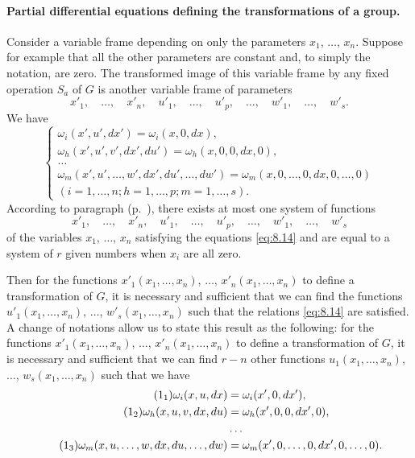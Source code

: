 \paragraph{Partial differential equations defining the transformations of a group.}
\label{sec:113}
Consider a variable frame depending on only the parameters $x_{1}$, $\dots$, $x_{n}$. Suppose for example that all the other parameters are constant and, to simply the notation, are zero. The transformed image of this variable frame by any fixed operation $S_{a}$ of $G$ is another variable frame of parameters
\[
x'_{1},\quad\dots,\quad x'_{n},\quad u'_{1},\quad\dots,\quad u'_{p},\quad\dots,\quad w'_{1},\quad\dots,\quad w'_{s}.
\]
We have
\begin{equation}
  \label{eq:8.14}
  \left\{
    \begin{gathered}
      \omega_{i}(x',u',dx')=\omega_{i}(x,0,dx),\\
      \omega_{h}(x',u',v',dx',du')=\omega_{h}(x,0,0,dx,0),\\
      \dots\\
      \omega_{m}(x',u',\dots,w',dx',du',\dots,dw')=\omega_{m}(x,0,\dots,0,dx,0,\dots,0)\\
      (i=1,\dots,n;h=1,\dots,p;m=1,\dots,s).
    \end{gathered}
  \right.
\end{equation}
According to paragraph  (p.~\pageref{sec:84}), there exists at most one system of functions
\[
x'_{1},\quad\dots,\quad x'_{n},\quad u'_{1},\quad\dots,\quad u'_{p},\quad\dots,\quad w'_{1},\quad\dots,\quad w'_{s}
\]
of the variables $x_{1}$, $\dots$, $x_{n}$ satisfying the equations \eqref{eq:8.14} and are equal to a system of $r$ given numbers when $x_{i}$ are all zero.

Then for the functions $x'_{1}(x_{1},\dots,x_{n})$, $\dots$, $x'_{n}(x_{1},\dots,x_{n})$ to define a transformation of $G$, it is necessary and sufficient that we can find the functions $u'_{1}(x_{1},\dots,x_{n})$, $\dots$, $w'_{s}(x_{1},\dots,x_{n})$ such that the relations \eqref{eq:8.14} are satisfied. A change of notations allow us to state this result as the following: for the functions $x'_{1}(x_{1},\dots,x_{n})$, $\dots$, $x'_{n}(x_{1},\dots,x_{n})$ to define a transformation of $G$, it is necessary and sufficient that we can find $r-n$ other functions $u_{1}(x_{1},\dots,x_{n})$, $\dots$, $w_{s}(x_{1},\dots,x_{n})$ such that we have
\begin{align}\addtocounter{equation}{1}
  \label{eq:8.15-1}\tag{\arabic{equation}$_{1}$}
  \omega_{i}(x,u,dx)&=\omega_{i}(x',0,dx'),\\
  \label{eq:8.15-2}\tag{\arabic{equation}$_{2}$}
  \omega_{h}(x,u,v,dx,du)&=\omega_{h}(x',0,0,dx',0),\\
  \notag&\dots\\
  \label{eq:8.15-3}\tag{\arabic{equation}$_{3}$}
  \omega_{m}(x,u,\dots,w,dx,du,\dots,dw)&=\omega_{m}(x',0,\dots,0,dx',0,\dots,0).
\end{align}

